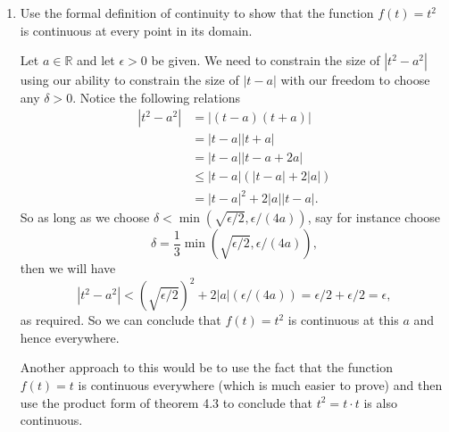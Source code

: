 \documentclass[10pt]{memoir}
\newcounter{pass}
\begin{document}
\begin{enumerate}
\item
Use the formal definition of continuity to show that the function $f(t) =t^2$ is continuous at every point in its domain.
\begin{solution}
Let $a \in \mathbb{R}$ and let $\epsilon >0$ be given. We need to constrain the size of $|t^2 - a^2|$ using our ability to constrain the size of $|t - a|$ with our freedom to choose any $\delta > 0$. Notice the following relations
\begin{align*}
|t^2 - a^2| &= |(t-a)(t+a)| \\
&= |t-a||t+a| \\
&= |t-a||t-a + 2a| \\
&\leq |t-a|\left ( |t-a| + 2 |a| \right )\\
&= |t-a|^2 + 2|a||t-a|.
\end{align*}
So as long as we choose $\delta < \min(\sqrt{\epsilon/2},\epsilon/(4a))$, say for instance choose
$$\delta = \frac{1}{3} \min(\sqrt{\epsilon/2},\epsilon/(4a)),$$
then we will have
$$|t^2 - a^2| < (\sqrt{\epsilon/2})^2 + 2|a| (\epsilon/(4a))=\epsilon/2 + \epsilon/2 = \epsilon,$$
as required. So we can conclude that $f(t)=t^2$ is continuous at this $a$ and hence everywhere.

Another approach to this would be to use the fact that the function $f(t) = t$ is continuous everywhere (which is much easier to prove) and then use the product form of theorem 4.3 to conclude that $t^2 = t \cdot t$ is also continuous.

\end{solution}

\setcounter{pass}{\value{enumi}}
\end{enumerate}
\end{document}
